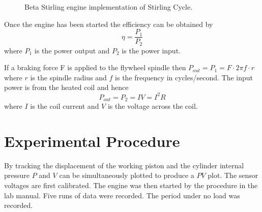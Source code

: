 \documentclass[9pt,twocolumn,twoside]{osajnl}
\begin{document}
\begin{figure}[htbp]
\centering
{}
\caption{Beta Stirling engine implementation of Stirling Cycle.}
\label{fig:stirlingcycle}
\end{figure}
Once the engine has been started the efficiency can be obtained by 
\begin{equation} \label{efficiency}
\eta = \frac{P_1}{P_2}
\end{equation}
where $P_1$ is the power output and $P_2$ is the power input.

If a braking force F is applied to the flywheel spindle then \(P_{out} = P_1 = F\cdot2\pi f\cdot r\) where $r$ is the spindle radius and $f$ is the frequency in cycles/second. The input power is from the heated coil and hence 
\begin{equation} \label{pout}
P_{out} = P_2 = IV = I^2R
\end{equation}
where $I$ is the coil current and $V$ is the voltage across the coil.\cite{labmanual}

\section{Experimental Procedure}

By tracking the displacement of the working piston and the cylinder internal pressure $P$ and $V$ can be simultaneously plotted to produce a $PV$ plot. The sensor voltages are first calibrated. The engine was then started by the procedure in the lab manual.\cite{labmanual} Five runs of data were recorded. The period under no load was recorded. 
\end{document}
